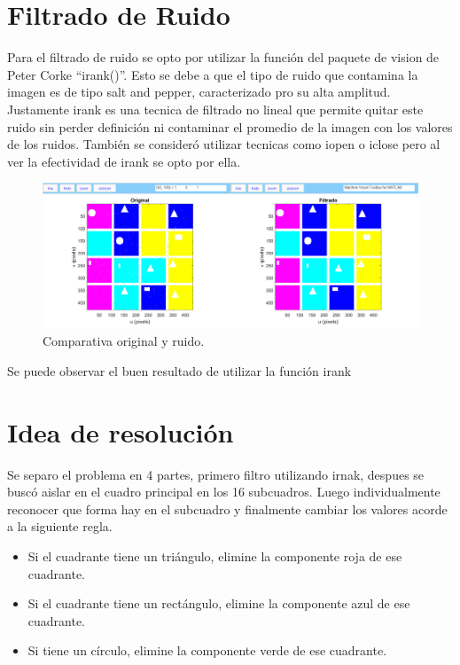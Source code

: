 







\tableofcontents
\newpage

\section{Filtrado de Ruido}
Para el filtrado de ruido se opto por utilizar la funci\'on del paquete de vision de Peter Corke ``irank()''. 
Esto se debe a que el tipo de ruido que contamina la imagen es de tipo salt and pepper, caracterizado pro su alta amplitud. Justamente irank es una tecnica de filtrado no lineal que permite quitar este ruido sin perder definici\'on ni contaminar el promedio de la imagen con los valores  de los ruidos. Tambi\'en se consider\'o utilizar tecnicas como iopen o iclose pero al ver la efectividad de irank se opto por ella.

\begin{figure}[H]
	\centering
	\includegraphics[width=0.8\linewidth]{Imagenes/comparacion_ruido.png}
	\caption{Comparativa original y ruido.}	
	\label{fig:or}
\end{figure}
Se puede observar el buen resultado de utilizar la funci\'on irank

\section{Idea de resoluci\'on}
Se separo el problema en 4 partes, primero filtro utilizando irnak, despues se busc\'o aislar en el cuadro principal en los 16 subcuadros.
Luego individualmente reconocer que forma hay en el subcuadro y finalmente cambiar los valores acorde a la siguiente regla.
\begin{itemize}
\item Si el cuadrante tiene un triángulo, elimine la componente roja de ese cuadrante.
\item Si el cuadrante tiene un rectángulo,  elimine la componente azul de ese cuadrante.
\item Si tiene un círculo, elimine la componente verde de ese cuadrante.
\end{itemize}
